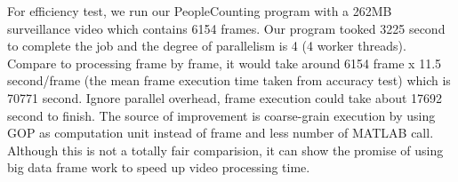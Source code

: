 For efficiency test, we run our PeopleCounting program with a 262MB surveillance
video which contains 6154 frames. Our program tooked 3225 second to complete the
job and the degree of parallelism is 4 (4 worker threads). Compare to processing
frame by frame, it would take around 6154 frame x 11.5 second/frame (the mean
frame execution time taken from accuracy test) which is 70771 second. Ignore
parallel overhead, frame execution could take about 17692 second to finish. The
source of improvement is coarse-grain execution by using GOP as computation unit
instead of frame and less number of MATLAB call. Although this is not a totally
fair comparision, it can show the promise of using big data frame work to speed
up video processing time.
